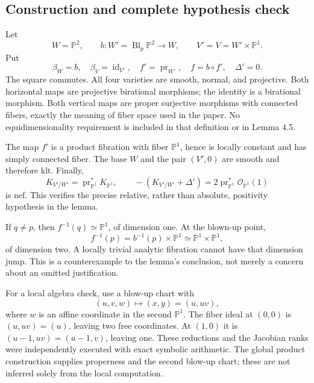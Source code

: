 \documentclass[10pt]{article}
\begin{document}
\subsection*{Construction and complete hypothesis check}
Let \[W=\mathbb P^2,\qquad b:W'=\operatorname{Bl}_p\mathbb P^2\longrightarrow W,\qquad
 V'=V=W'\times\mathbb P^1.\] Put \[\beta_W=b,\quad \beta_V=\operatorname{id}_{V'},\quad
 f'=\operatorname{pr}_{W'},\quad f=b\circ f',\quad \Delta'=0 .\] The square commutes. All four varieties are smooth, normal, and projective. Both horizontal maps are projective birational morphisms; the identity is a birational morphism. Both vertical maps are proper surjective morphisms with connected fibers, exactly the meaning of fiber space used in the paper. No equidimensionality requirement is included in that definition or in Lemma 4.5.\par
The map \(f'\) is a product fibration with fiber \(\mathbb P^1\), hence is locally constant and has simply connected fiber. The base \(W\) and the pair \((V',0)\) are smooth and therefore klt. Finally, \[K_{V'/W'}=\operatorname{pr}_{\mathbb P^1}^{*}K_{\mathbb P^1},\qquad
 - (K_{V'/W'}+\Delta')=2\operatorname{pr}_{\mathbb P^1}^{*}\mathcal O_{\mathbb P^1}(1)\] is nef. This verifies the precise relative, rather than absolute, positivity hypothesis in the lemma.\par
If \(q\ne p\), then \(f^{-1}(q)\simeq\mathbb P^1\), of dimension one. At the blown-up point, \[f^{-1}(p)=b^{-1}(p)\times\mathbb P^1\simeq\mathbb P^1\times\mathbb P^1,\] of dimension two. A locally trivial analytic fibration cannot have that dimension jump. This is a counterexample to the lemma’s conclusion, not merely a concern about an omitted justification.\par
For a local algebra check, use a blow-up chart with \[(u,v,w)\longmapsto(x,y)=(u,uv),\] where \(w\) is an affine coordinate in the second \(\mathbb P^1\). The fiber ideal at \((0,0)\) is \((u,uv)=(u)\), leaving two free coordinates. At \((1,0)\) it is \((u-1,uv)=(u-1,v)\), leaving one. These reductions and the Jacobian ranks were independently executed with exact symbolic arithmetic. The global product construction supplies properness and the second blow-up chart; these are not inferred solely from the local computation.\par
\end{document}
